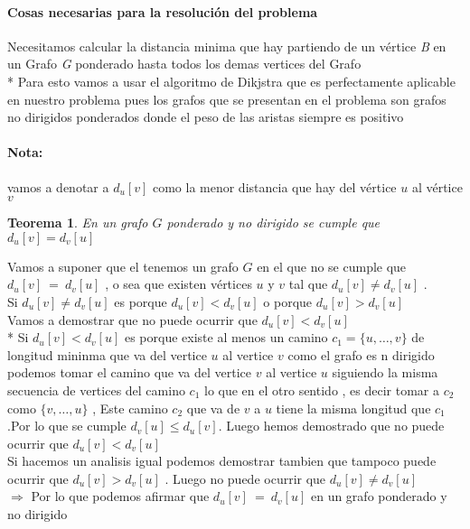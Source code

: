 \documentclass{article}
\begin{document}
    \paragraph*{Cosas necesarias para la resoluci\'on del problema } 
    Necesitamos calcular la distancia minima que hay partiendo de un v\'ertice \textit{B} en un Grafo \textit{G} ponderado hasta todos los demas vertices del Grafo 
    \\*
    Para esto vamos a usar el algoritmo de Dikjstra que es perfectamente aplicable en nuestro problema pues los grafos que se presentan en el problema son grafos no dirigidos ponderados donde el peso de las aristas siempre es positivo 


    \paragraph*{Nota:} vamos a denotar a $d_u\left[v\right]$ como la menor distancia que hay del v\'ertice $u$ al v\'ertice  $v$ 

    \newtheorem{thm}{Teorema}
    \begin{thm}
        En un grafo $G$ ponderado y no dirigido se cumple que $d_u\left[v\right] = d_v\left[u\right] $ 
    \end{thm}

    \noindent Vamos a suponer que el tenemos un grafo $G$ en el que no se cumple que $d_u\left[v\right] ~= ~d_v\left[u\right] $ ,  o sea que existen 
    v\'ertices $u$ y $v$ tal que $d_u\left[v\right] \neq d_v\left[u\right] $ .
    \\[10pt]
    Si  $d_u\left[v\right] \neq d_v\left[u\right] $  es porque $d_u\left[v\right] < d_v\left[u\right] $  o porque $d_u\left[v\right] > d_v\left[u\right] $ 
    \\[10pt]
    Vamos a demostrar que no puede ocurrir que $d_u\left[v\right] < d_v\left[u\right] $
    \\*
    Si $d_u\left[v\right] < d_v\left[u\right] $ es porque existe al menos un camino $c_1 = \{u ,\dots, v\}$ de longitud mininma que va del vertice $u$ al vertice $v$ 
    como el grafo es n dirigido podemos tomar el camino que va del vertice $v$ al vertice $u$ siguiendo la misma secuencia de vertices del camino $c_1$ lo que en el otro sentido ,  es decir 
    tomar a $c_2$ como $\{v,\dots , u\}$ , Este camino $c_2$ que va de $v$ a $u$ tiene la misma longitud que $c_1$ .Por lo que se cumple  $d_v\left[u\right] \leq d_u\left[v\right]$. 
    Luego hemos demostrado que  no puede ocurrir que $d_u\left[v\right] < d_v\left[u\right] $
    \\[10pt]
    Si hacemos un analisis igual podemos demostrar tambien que tampoco puede ocurrir que $d_u\left[v\right] > d_v\left[u\right] $ . 
    Luego no puede ocurrir que $d_u\left[v\right] \neq d_v\left[u\right] $ 
    \\[5pt]
    $\Rightarrow$ Por lo que podemos afirmar que $d_u\left[v\right] ~= ~ d_v\left[u\right] $ en un grafo ponderado y no dirigido 
\end{document}
